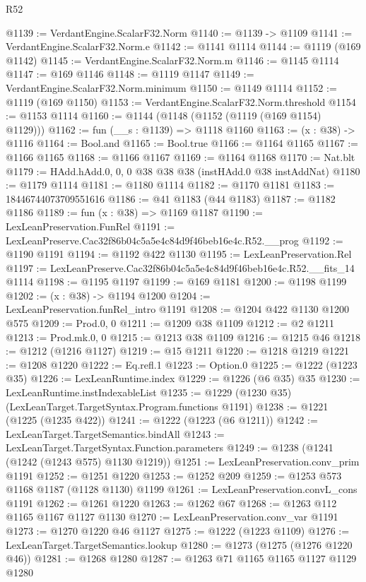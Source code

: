 \begin{lexlean}{R52}
\begin{coremodule}
@1139 := VerdantEngine.ScalarF32.Norm
@1140 := @1139 -> @1109
@1141 := VerdantEngine.ScalarF32.Norm.e
@1142 := @1141 @1114
@1144 := @1119 (@169 @1142)
@1145 := VerdantEngine.ScalarF32.Norm.m
@1146 := @1145 @1114
@1147 := @169 @1146
@1148 := @1119 @1147
@1149 := VerdantEngine.ScalarF32.Norm.minimum
@1150 := @1149 @1114
@1152 := @1119 (@169 @1150)
@1153 := VerdantEngine.ScalarF32.Norm.threshold
@1154 := @1153 @1114
@1160 := @1144 (@1148 (@1152 (@1119 (@169 @1154) @1129)))
@1162 := fun (__s : @1139) => @1118 @1160
@1163 := (x : @38) -> @1116
@1164 := Bool.and
@1165 := Bool.true
@1166 := @1164 @1165
@1167 := @1166 @1165
@1168 := @1166 @1167
@1169 := @1164 @1168
@1170 := Nat.blt
@1179 := HAdd.hAdd.{0, 0, 0} @38 @38 @38 (instHAdd.{0} @38 instAddNat)
@1180 := @1179 @1114
@1181 := @1180 @1114
@1182 := @1170 @1181
@1183 := 18446744073709551616
@1186 := @41 @1183 (@44 @1183)
@1187 := @1182 @1186
@1189 := fun (x : @38) => @1169 @1187
@1190 := LexLeanPreservation.FunRel
@1191 := LexLeanPreserve.Cac32f86b04c5a5e4c84d9f46beb16e4c.R52.__prog
@1192 := @1190 @1191
@1194 := @1192 @422 @1130
@1195 := LexLeanPreservation.Rel
@1197 := LexLeanPreserve.Cac32f86b04c5a5e4c84d9f46beb16e4c.R52.__fits_14 @1114
@1198 := @1195 @1197
@1199 := @169 @1181
@1200 := @1198 @1199
@1202 := (x : @38) -> @1194 @1200
@1204 := LexLeanPreservation.funRel_intro @1191
@1208 := @1204 @422 @1130 @1200 @575
@1209 := Prod.{0, 0}
@1211 := @1209 @38 @1109
@1212 := @2 @1211
@1213 := Prod.mk.{0, 0}
@1215 := @1213 @38 @1109
@1216 := @1215 @46
@1218 := @1212 (@1216 @1127)
@1219 := @15 @1211
@1220 := @1218 @1219
@1221 := @1208 @1220
@1222 := Eq.refl.{1}
@1223 := Option.{0}
@1225 := @1222 (@1223 @35)
@1226 := LexLeanRuntime.index
@1229 := @1226 (@6 @35) @35
@1230 := LexLeanRuntime.instIndexableList
@1235 := @1229 (@1230 @35) (LexLeanTarget.TargetSyntax.Program.functions @1191)
@1238 := @1221 (@1225 (@1235 @422))
@1241 := @1222 (@1223 (@6 @1211))
@1242 := LexLeanTarget.TargetSemantics.bindAll
@1243 := LexLeanTarget.TargetSyntax.Function.parameters
@1249 := @1238 (@1241 (@1242 (@1243 @575) @1130 @1219))
@1251 := LexLeanPreservation.conv_prim @1191
@1252 := @1251 @1220
@1253 := @1252 @209
@1259 := @1253 @573 @1168 @1187 (@1128 @1130) @1199
@1261 := LexLeanPreservation.convL_cons @1191
@1262 := @1261 @1220
@1263 := @1262 @67
@1268 := @1263 @112 @1165 @1167 @1127 @1130
@1270 := LexLeanPreservation.conv_var @1191
@1273 := @1270 @1220 @46 @1127
@1275 := @1222 (@1223 @1109)
@1276 := LexLeanTarget.TargetSemantics.lookup
@1280 := @1273 (@1275 (@1276 @1220 @46))
@1281 := @1268 @1280
@1287 := @1263 @71 @1165 @1165 @1127 @1129 @1280

\end{coremodule}
\end{lexlean}
